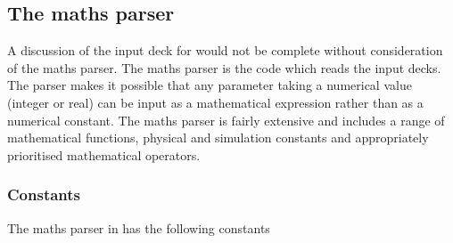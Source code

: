 \subsection{The maths parser}
\label{sec:maths_parser}
A discussion of the input deck for {\EPOCH} would not be complete without
consideration of the maths parser. The maths parser is the code which reads
the input decks.
The parser makes it possible that any parameter taking a
numerical value (integer or real) can be input as a mathematical expression
rather than as a numerical constant. The maths parser is fairly extensive and
includes a range of mathematical functions, physical and simulation constants
and appropriately prioritised mathematical operators.


\subsubsection{Constants}
\label{sec:constants}
The maths parser in {\EPOCH}  has the following constants
